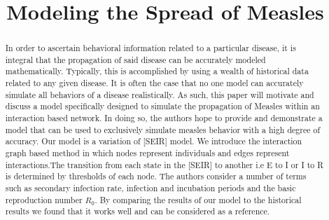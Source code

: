 \documentclass[conference]{IEEEtran}
\begin{document}
\title{Modeling the Spread of Measles}

\author{
}
\maketitle

\begin{abstract} %
In order to ascertain behavioral information related to a particular disease, it is integral that the propagation of said disease can be accurately modeled mathematically. Typically, this is accomplished by using a wealth of historical data related to any given disease. It is often the case that no one model can accurately simulate all behaviors of a disease realistically. As such, this paper will motivate and discuss a model specifically designed to simulate the propagation of Measles within an interaction based network. In doing so, the authors hope to provide and demonstrate a model that can be used to exclusively simulate measles behavior with a high degree of accuracy. Our model is a variation of [SEIR] model. We introduce the interaction graph based method in which nodes represent individuals and edges represent interactions.The transition from each state in the [SEIR] to another i.e E to I or I to R is determined by thresholds of each node.
The authors consider a number of terms such as secondary infection rate, infection and incubation periods and the basic reproduction number $R_0$.
By comparing the results of our model to the historical results we found that it works well and can be considered as a reference.
\end{abstract}
\end{document}
